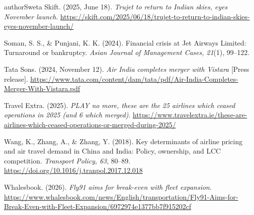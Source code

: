 \begin{mergedcontribution}{authorSweta}
Skift. (2025, June 18). \textit{Trujet to return to Indian skies, eyes November launch}. \url{https://skift.com/2025/06/18/trujet-to-return-to-indian-skies-eyes-november-launch/}

Soman, S. S., \& Punjani, K. K. (2024). Financial crisis at Jet Airways Limited: Turnaround or bankruptcy. \textit{Asian Journal of Management Cases, 21}(1), 99--122.

Tata Sons. (2024, November 12). \textit{Air India completes merger with Vistara} [Press release]. \url{https://www.tata.com/content/dam/tata/pdf/Air-India-Completes-Merger-With-Vistara.pdf}

Travel Extra. (2025). \textit{PLAY no more, these are the 25 airlines which ceased operations in 2025 (and 6 which merged)}. \url{https://www.travelextra.ie/these-are-airlines-which-ceased-operations-or-merged-during-2025/}

Wang, K., Zhang, A., \& Zhang, Y. (2018). Key determinants of airline pricing and air travel demand in China and India: Policy, ownership, and LCC competition. \textit{Transport Policy, 63}, 80--89. \url{https://doi.org/10.1016/j.tranpol.2017.12.018}

Whalesbook. (2026). \textit{Fly91 aims for break-even with fleet expansion}. \url{https://www.whalesbook.com/news/English/transportation/Fly91-Aims-for-Break-Even-with-Fleet-Expansion/6972974e1377bb7f915202cf}

\endgroup
\end{mergedcontribution}
